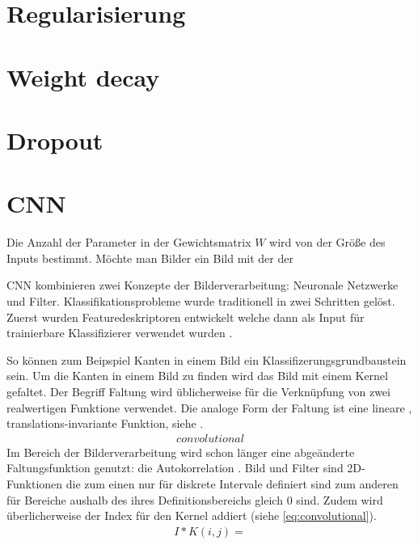 \section{Regularisierung}
\label{sec:Regularisierung}
\section{Weight decay}
\section{Dropout}



\section{CNN}
Die Anzahl der Parameter in der Gewichtsmatrix \(W\) wird von der Größe des Inputs bestimmt.
Möchte man Bilder ein Bild mit der der 

CNN kombinieren zwei Konzepte der Bilderverarbeitung: Neuronale Netzwerke und Filter.
Klassifikationsprobleme wurde traditionell in zwei Schritten gelöst. Zuerst wurden 
Featuredeskriptoren entwickelt welche dann als Input für trainierbare Klassifizierer 
verwendet wurden \autocite[2353]{RawatDeepConvolutionalNeural2017}.


So können zum Beipspiel Kanten in einem Bild ein Klassifizerungsgrundbaustein sein. 
Um die Kanten in einem Bild zu finden wird das Bild mit einem Kernel  gefaltet.  
Der Begriff Faltung wird üblicherweise für die Verknüpfung von zwei realwertigen Funktione verwendet. Die analoge Form der Faltung ist eine lineare , translations-invariante Funktion, siehe \cite[28]{SusseBildverarbeitungundObjekterkennung2014}. 
\begin{align}
    \label{eq:convolutional}
    convolutional
\end{align}
Im Bereich der Bilderverarbeitung wird schon länger eine abgeänderte Faltungsfunktion genutzt: die Autokorrelation . Bild und Filter sind 2D-Funktionen die zum einen nur für diskrete Intervale definiert sind zum anderen für Bereiche aushalb des ihres Definitionsbereichs gleich 0 sind. Zudem wird überlicherweise der Index für den Kernel addiert (siehe \cref{eq:convolutional}).
\begin{align}
    \label{eq:crosscorrelation}
    I*K(i,j) =
\end{align}


